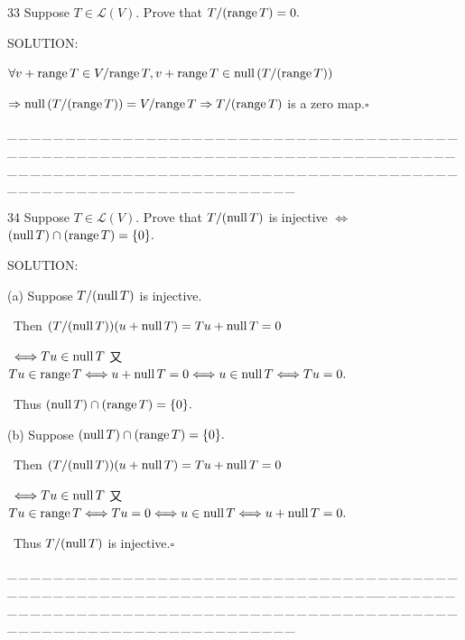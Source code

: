 \documentclass[a4paper, 11pt, UTF8]{article}
\def\range{\textup{range}\,}
\def\null{\textup{null\,}}
\def\Lm{\mathcal{L}}
\begin{document}
\begin{large}
{\timesbf\Large 33} {\timessl\Large 
Suppose $T\in\Lm(V).$ Prove that $T/(\range T)=0.$
}\par
{\timesbf S\footnotesize{OLUTION:}}\par\quad
$\forall v+\range T\in V/\range T,v+\range T\in\null(T/(\range T))$\par\quad
$\Rightarrow\null(T/(\range T))=V/\range T\Rightarrow T/(\range T)$ is a zero map.\quad$\square$\par
{\tiny \_\,\_\,\_\,\_\,\_\,\_\,\_\,\_\,\_\,\_\,\_\,\_\,\_\,\_\,\_\,\_\,\_\,\_\,\_\,\_\,\_\,\_\,\_\,\_\,\_\,\_\,\_\,\_\,\_\,\_\,\_\,\_\,\_\,\_\,\_\,\_\,\_\,\_\,\_\,\_\,\_\,\_\,\_\,\_\,\_\,\_\,\_\,\_\,\_\,\_\,\_\,\_\,\_\,\_\,\_\,\_\,\_\,\_\,\_\,\_\,\_\,\_\,\_\,\_\,\_\,\_\,\_\,\_\,\_\,\_\,\_\_\,\_\,\_\,\_\,\_\,\_\,\_\,\_\,\_\,\_\,\_\,\_\,\_\,\_\,\_\,\_\,\_\,\_\,\_\,\_\,\_\,\_\,\_\,\_\,\_\,\_\,\_\,\_\,\_\,\_\,\_\,\_\,\_\,\_\,\_\,\_\,\_\,\_\,\_\,\_\,\_\,\_\,\_\,\_\,\_\,\_\,\_\,\_\,\_\,\_\,\_\,\_\,\_\,\_\,\_\,\_\,\_\,\_\,\_\,\_\,\_\,\_\,\_\,\_\,\_\,\_\,\_\,\_\,\_\,\_\,\_\par}

{\timesbf\Large 34} {\timessl\Large 
Suppose $T\in\Lm(V).$ Prove that $T/(\null T)$ is injective $\Longleftrightarrow$ $(\null T)\cap(\range T)=\{0\}.$
}\par
{\timesbf S\footnotesize{OLUTION:}}\par\quad
(a) Suppose $T/(\null T)$ is injective.\par\qquad\,
Then $(T/(\null T))(u+\null T)=Tu+\null T=0$\par\qquad\,
$\Longleftrightarrow Tu\in\null T$ 又 $Tu\in\range T\Longleftrightarrow u+\null T=0\Longleftrightarrow u\in\null T\Longleftrightarrow Tu=0.$\par\qquad\,
Thus $(\null T)\cap(\range T)=\{0\}.$\par\quad
(b) Suppose $(\null T)\cap(\range T)=\{0\}.$\par\qquad\,
Then $(T/(\null T))(u+\null T)=Tu+\null T=0$\par\qquad\,
$\Longleftrightarrow Tu\in\null T$ 又 $Tu\in\range T\Longleftrightarrow Tu=0\Longleftrightarrow u\in\null T\Longleftrightarrow u+\null T=0.$\par\qquad\,
Thus $T/(\null T)$ is injective.\quad$\square$\par
{\tiny \_\,\_\,\_\,\_\,\_\,\_\,\_\,\_\,\_\,\_\,\_\,\_\,\_\,\_\,\_\,\_\,\_\,\_\,\_\,\_\,\_\,\_\,\_\,\_\,\_\,\_\,\_\,\_\,\_\,\_\,\_\,\_\,\_\,\_\,\_\,\_\,\_\,\_\,\_\,\_\,\_\,\_\,\_\,\_\,\_\,\_\,\_\,\_\,\_\,\_\,\_\,\_\,\_\,\_\,\_\,\_\,\_\,\_\,\_\,\_\,\_\,\_\,\_\,\_\,\_\,\_\,\_\,\_\,\_\,\_\,\_\_\,\_\,\_\,\_\,\_\,\_\,\_\,\_\,\_\,\_\,\_\,\_\,\_\,\_\,\_\,\_\,\_\,\_\,\_\,\_\,\_\,\_\,\_\,\_\,\_\,\_\,\_\,\_\,\_\,\_\,\_\,\_\,\_\,\_\,\_\,\_\,\_\,\_\,\_\,\_\,\_\,\_\,\_\,\_\,\_\,\_\,\_\,\_\,\_\,\_\,\_\,\_\,\_\,\_\,\_\,\_\,\_\,\_\,\_\,\_\,\_\,\_\,\_\,\_\,\_\,\_\,\_\,\_\,\_\,\_\,\_\par}


\end{large}
\end{document}
